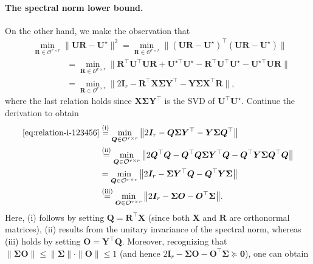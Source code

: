 \paragraph{The spectral norm lower bound.}
On the other hand, we make the observation that
%
\begin{align}
	& \min_{\bm{R}\in\mathcal{O}^{r\times r}}\big\|\bm{U}\bm{R}-\bm{U}^{\star}\big\|^{2}  =\min_{\bm{R}\in\mathcal{O}^{r\times r}}\big\|(\bm{U}\bm{R}-\bm{U}^{\star})^{\top}(\bm{U}\bm{R}-\bm{U}^{\star})\big\|\nonumber \\
 & \qquad\qquad =\min_{\bm{R}\in\mathcal{O}^{r\times r}}\big\|\bm{R}^{\top}\bm{U}^{\top}\bm{U}\bm{R}+\bm{U}^{\star\top}\bm{U}^{\star}-\bm{R}^{\top}\bm{U}^{\top}\bm{U}^{\star}-\bm{U}^{\star\top}\bm{U}\bm{R}\big\|\nonumber \\
 & \qquad\qquad{=}\min_{\bm{R}\in\mathcal{O}^{r\times r}}\big\|2\bm{I}_{r}-\bm{R}^{\top}\bm{X}\bm{\Sigma}\bm{Y}^{\top}-\bm{Y}\bm{\Sigma}\bm{X}^{\top}\bm{R}\big\|,
	\label{eq:relation-i-123456}
\end{align}
%
where the last relation holds since $\bm{X}\bm{\Sigma}\bm{Y}^{\top}$ is the
SVD of $\bm{U}^{\top}\bm{U}^{\star}$. Continue the derivation to obtain
%
\begin{align}
\eqref{eq:relation-i-123456}  & \overset{(\mathrm{i})}{=}\min_{\bm{Q}\in\mathcal{O}^{r\times r}}\big\|2\bm{I}_{r}-\bm{Q}\bm{\Sigma}\bm{Y}^{\top}-\bm{Y}\bm{\Sigma}\bm{Q}^{\top}\big\|\nonumber \\
 & \overset{(\mathrm{ii})}{=}\min_{\bm{Q}\in\mathcal{O}^{r\times r}}\big\|2\bm{Q}^{\top}\bm{Q}-\bm{Q}^{\top}\bm{Q}\bm{\Sigma}\bm{Y}^{\top}\bm{Q}-\bm{Q}^{\top}\bm{Y}\bm{\Sigma}\bm{Q}^{\top}\bm{Q}\big\|\nonumber \\
 &  =\min_{\bm{Q}\in\mathcal{O}^{r\times r}}\big\|2\bm{I}_{r}-\bm{\Sigma}\bm{Y}^{\top}\bm{Q}-\bm{Q}^{\top}\bm{Y}\bm{\Sigma}\big\|\nonumber \\
 &  \overset{(\mathrm{iii})}{=}\min_{\bm{O}\in\mathcal{O}^{r\times r}}\big\|2\bm{I}_{r}-\bm{\Sigma}\bm{O}-\bm{O}^{\top}\bm{\Sigma}\big\|.\label{eq:UR-Ustar-identity}
\end{align}
%
Here, (i) follows by setting $\bm{Q}=\bm{R}^{\top}\bm{X}$
(since both $\bm{X}$ and $\bm{R}$ are orthonormal matrices), (ii)
results from the unitary invariance of the spectral norm, whereas (iii) holds
by setting $\bm{O}=\bm{Y}^{\top}\bm{Q}$. Moreover, recognizing that
$\|\bm{\Sigma}\bm{O}\|\leq\|\bm{\Sigma}\| \cdot \|\bm{O}\|\leq1$ (and hence
$2\bm{I}_{r}-\bm{\Sigma}\bm{O}-\bm{O}^{\top}\bm{\Sigma}\succeq\bm{0}$),
one can obtain
